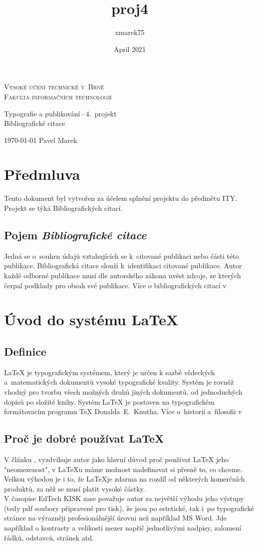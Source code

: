 \documentclass[a4paper, 11pt]{article}
\title{proj4}
\author{xmarek75}
\date{April 2021}
\begin{document}
\begin{titlepage}

\begin{center}
\Huge
\textsc{Vysoké učení technické v~Brně\\
\huge
Fakulta informačních technologií} \\

\LARGE
Typografie a publikování\,--\,4.~projekt \\
\Huge
Bibliografické citace
\end{center}

{\Large \today \hfill
Pavel Marek }
\end{titlepage}
\section*{Předmluva}
Tento dokument byl vytvořen za účelem splnění projektu do předmětu ITY.\\
Projekt se týká Bibliografických citací.
\subsection*{Pojem \emph{Bibliografické citace}}
Jedná se o~souhrn údajů vztahujících se k~citované publikaci nebo části této publikace. Bibliografická citace slouží k~identifikaci citované publikace.
Autor každé odborné publikace musí dle autorského zákona uvést zdroje, ze kterých čerpal podklady pro obsah své publikace. Více o bibliografických citací v \cite{Pysny}
\section{Úvod do systému {\LaTeX}}
\subsection{Definice}
{\LaTeX} je typografickým systémem, který je určen k sazbě vědeckých a~matematických dokumentů vysoké typografické kvality. Systém je rovněž vhodný pro tvorbu všech možných druhů jiných dokumentů, od jednoduchých dopisů po složité knihy. Systém {\LaTeX} je postaven na typografickém formátovacím programu {\TeX} Donalda~E.~Knutha. Více o~historii a~filosofii v \cite{Oetiker}
\subsection{Proč je dobré používat \LaTeX}
V článku \cite{Simecek}, vyzdvihuje autor jako hlavní důvod proč používat {\LaTeX} jeho "neomezenost", v {\LaTeX}u máme možnost nadefinovat si přesně to, co chceme.
Velkou výhodou je i to, že \LaTeX je zdarma na rozdíl od některých komerčních produktů, za něž se musí platit vysoké částky.\\
V časopise EdTech KISK \cite{Davidek} zase považuje autor za největší výhodu jeho výstupy (tedy pdf soubory připravené pro tisk), že jsou po estetické, tak i~po typografické stránce na výrazněji profesionálnější úrovni než například MS Word. Jde například o kontrasty a velikosti mezer napříč jednotlivými nadpisy, zalomení řádků, odstavců, stránek atd.  
\end{document}
